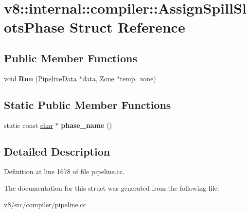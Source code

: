 \hypertarget{structv8_1_1internal_1_1compiler_1_1AssignSpillSlotsPhase}{}\section{v8\+:\+:internal\+:\+:compiler\+:\+:Assign\+Spill\+Slots\+Phase Struct Reference}
\label{structv8_1_1internal_1_1compiler_1_1AssignSpillSlotsPhase}
\subsection*{Public Member Functions}
\begin{DoxyCompactItemize}
\item 
\mbox{\label{structv8_1_1internal_1_1compiler_1_1AssignSpillSlotsPhase_af07dc8c98c4ddf64f3ca7aa7505ab2ca}} 
void {\bfseries Run} (\mbox{\hyperlink{classv8_1_1internal_1_1compiler_1_1PipelineData}{Pipeline\+Data}} $\ast$data, \mbox{\hyperlink{classv8_1_1internal_1_1Zone}{Zone}} $\ast$temp\+\_\+zone)
\end{DoxyCompactItemize}
\subsection*{Static Public Member Functions}
\begin{DoxyCompactItemize}
\item 
\mbox{\label{structv8_1_1internal_1_1compiler_1_1AssignSpillSlotsPhase_ab98ee431175de3794efb9caab8f0ef8d}} 
static const \mbox{\hyperlink{classchar}{char}} $\ast$ {\bfseries phase\+\_\+name} ()
\end{DoxyCompactItemize}


\subsection{Detailed Description}


Definition at line 1678 of file pipeline.\+cc.



The documentation for this struct was generated from the following file\+:\begin{DoxyCompactItemize}
\item 
v8/src/compiler/pipeline.\+cc\end{DoxyCompactItemize}
